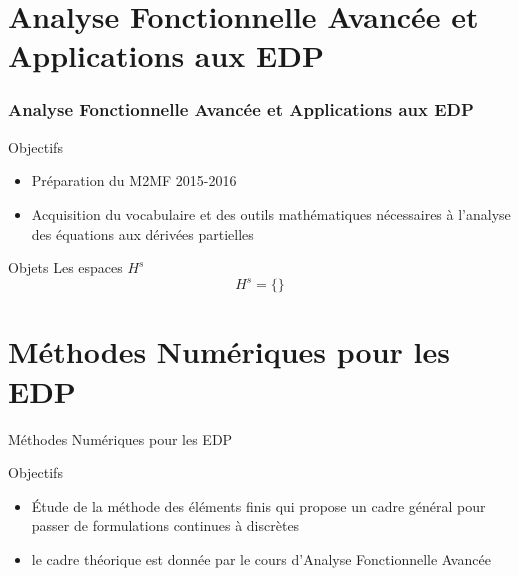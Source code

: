 \documentclass{beamer}
\begin{document}
\section{Analyse Fonctionnelle Avancée et Applications aux EDP}

\begin{frame}\frametitle{Analyse Fonctionnelle Avancée et Applications
    aux EDP}
  \begin{block}{Objectifs}
    \begin{itemize}
    \item Préparation du M2MF 2015-2016
    \item Acquisition du vocabulaire et des outils mathématiques nécessaires à
      l'analyse des équations aux dérivées partielles
    \end{itemize}
  \end{block}
  \begin{block}{Objets}
    Les espaces $H^s$
    \begin{equation*}
      H^s = \{ \}
    \end{equation*}
  \end{block}
\end{frame}

\section{Méthodes Numériques pour les EDP}
\begin{frame}{Méthodes Numériques pour les EDP}
  \begin{block}{Objectifs}
    \begin{itemize}
    \item Étude de la méthode des éléments finis qui propose un cadre
      général pour passer de formulations continues à discrètes
    \item le cadre théorique est donnée par le cours d'Analyse
      Fonctionnelle Avancée
    \end{itemize}
  \end{block}

\end{frame}
\end{document}
